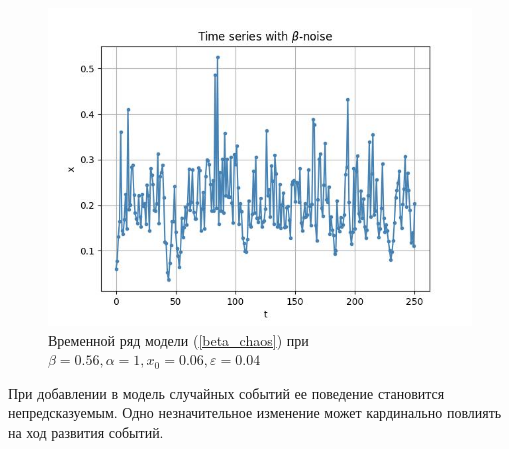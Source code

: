     \begin{figure}
        \centering
        \includegraphics[width=\textwidth]{stochastic/images/time_series_x_0_06_a_1_b_0_56_beta_chaos_epsilon_0_04_alive.jpg}
        
        \captionsetup{justification=centering}
        \caption{Временной ряд модели (\ref{beta_chaos}) при \(\beta = 0.56, \alpha = 1, x_0 = 0.06, \varepsilon = 0.04\)}
        \label{time_series_x_0_06_a_1_b_0_56_beta_chaos_epsilon_0_04_alive}
    \end{figure}

    При добавлении в модель случайных событий ее поведение становится непредсказуемым. Одно незначительное изменение может кардинально повлиять на ход развития событий.
